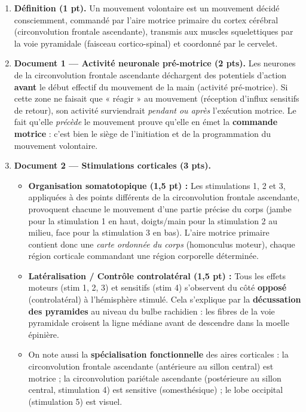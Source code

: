 \documentclass[11pt]{article}
\begin{document}
\begin{corrige}
\begin{enumerate}
\item \textbf{Définition (1 pt).} Un mouvement volontaire est un mouvement décidé consciemment, commandé par l'aire motrice primaire du cortex cérébral (circonvolution frontale ascendante), transmis aux muscles squelettiques par la voie pyramidale (faisceau cortico-spinal) et coordonné par le cervelet.
\item \textbf{Document 1 — Activité neuronale pré-motrice (2 pts).} Les neurones de la circonvolution frontale ascendante déchargent des potentiels d'action \textbf{avant} le début effectif du mouvement de la main (activité pré-motrice). Si cette zone ne faisait que « réagir » au mouvement (réception d'influx sensitifs de retour), son activité surviendrait \emph{pendant ou après} l'exécution motrice. Le fait qu'elle \emph{précède} le mouvement prouve qu'elle en émet la \textbf{commande motrice} : c'est bien le siège de l'initiation et de la programmation du mouvement volontaire.
\item \textbf{Document 2 — Stimulations corticales (3 pts).}
\begin{itemize}
\item \textbf{Organisation somatotopique (1,5 pt) :} Les stimulations 1, 2 et 3, appliquées à des points différents de la circonvolution frontale ascendante, provoquent chacune le mouvement d'une partie précise du corps (jambe pour la stimulation 1 en haut, doigts/main pour la stimulation 2 au milieu, face pour la stimulation 3 en bas). L'aire motrice primaire contient donc une \emph{carte ordonnée du corps} (homonculus moteur), chaque région corticale commandant une région corporelle déterminée.
\item \textbf{Latéralisation / Contrôle controlatéral (1,5 pt) :} Tous les effets moteurs (stim 1, 2, 3) et sensitifs (stim 4) s'observent du côté \textbf{opposé} (controlatéral) à l'hémisphère stimulé. Cela s'explique par la \textbf{décussation des pyramides} au niveau du bulbe rachidien : les fibres de la voie pyramidale croisent la ligne médiane avant de descendre dans la moelle épinière.
\item On note aussi la \textbf{spécialisation fonctionnelle} des aires corticales : la circonvolution frontale ascendante (antérieure au sillon central) est motrice ; la circonvolution pariétale ascendante (postérieure au sillon central, stimulation 4) est sensitive (somesthésique) ; le lobe occipital (stimulation 5) est visuel.

\end{itemize}
\end{enumerate}
\end{corrige}
\end{document}
